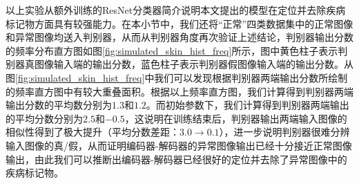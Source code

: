 以上实验从额外训练的ResNet分类器简介说明本文提出的模型在定位并去除疾病标记物方面具有较强能力。在本小节中，我们还将“正常”四类数据集中的正常图像和异常图像均送入判别器，从而从判别器角度再次验证上述结论，判别器输出分数的频率分布直方图如图\ref{fig:simulated_skin_hist_freq}所示，图中黄色柱子表示判别器真图像输入端的输出分数，蓝色柱子表示判别器假图像输入端的输出分数。从图\ref{fig:simulated_skin_hist_freq}中我们可以发现根据判别器两端输出分数所绘制的频率直方图中有较大重叠面积。根据以上频率直方图，我们计算得到判别器两端输出分数的平均数分别为$1.3 $和$1.2$。而初始参数下，我们计算得到判别器两端输出的平均分数分别为$2.5$和$-0.5$，这说明在训练结束后，判别器输出两端输入图像的相似性得到了极大提升（平均分数差距：$3.0\rightarrow 0.1$），进一步说明判别器很难分辨输入图像的真/假，从而证明编码器-解码器的异常图像输出已经十分接近正常图像输出，由此我们可以推断出编码器-解码器已经很好的定位并去除了异常图像中的疾病标记物。

